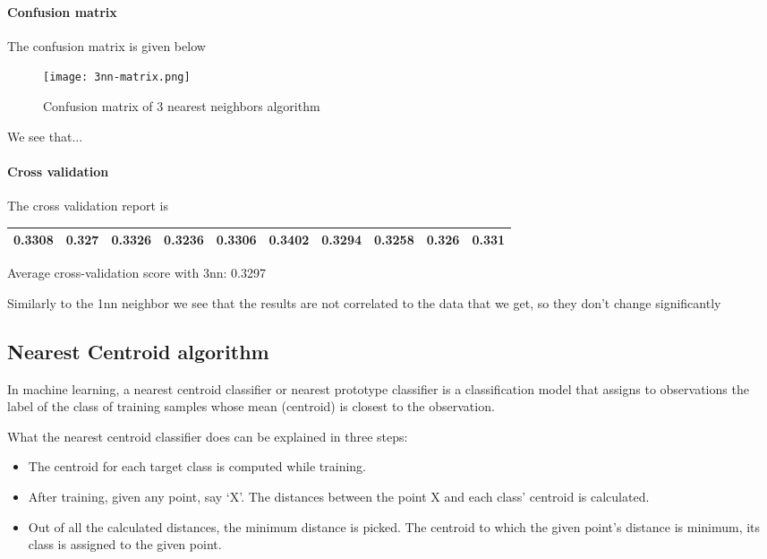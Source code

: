 \documentclass{article}
\begin{document}
\paragraph{Confusion matrix}
The confusion matrix is given below 

\begin{figure}[h!]
    \centering
    \texttt{[image: 3nn-matrix.png]}
    \caption{Confusion matrix of 3 nearest neighbors algorithm}
    \label{fig:3_neighbour_algorithm}
\end{figure}

We see that...

\paragraph{Cross validation}
The cross validation report is 

\begin{tabular}{|c|c|c|c|c|c|c|c|c|c|}
\hline
0.3308 & 0.327  & 0.3326 & 0.3236 & 0.3306 & 0.3402 & 0.3294 & 0.3258 & 0.326  & 0.331 \\
\hline
\end{tabular}

Average cross-validation score with 3nn: 0.3297

Similarly to the 1nn neighbor we see that the results are not correlated to the data that we get, so they don't change significantly 

\subsection{Nearest Centroid algorithm}
In machine learning, a nearest centroid classifier or nearest prototype classifier is a classification model that assigns to observations the label of the class of training samples whose mean (centroid) is closest to the observation.

What the nearest centroid classifier does can be explained in three steps: 

\begin{itemize}

\item The centroid for each target class is computed while training.
\item After training, given any point, say ‘X’. The distances between the point X and each class’ centroid is calculated.
\item Out of all the calculated distances, the minimum distance is picked. The centroid to which the given point’s distance is minimum, its class is assigned to the given point.
\end{itemize}
\end{document}
